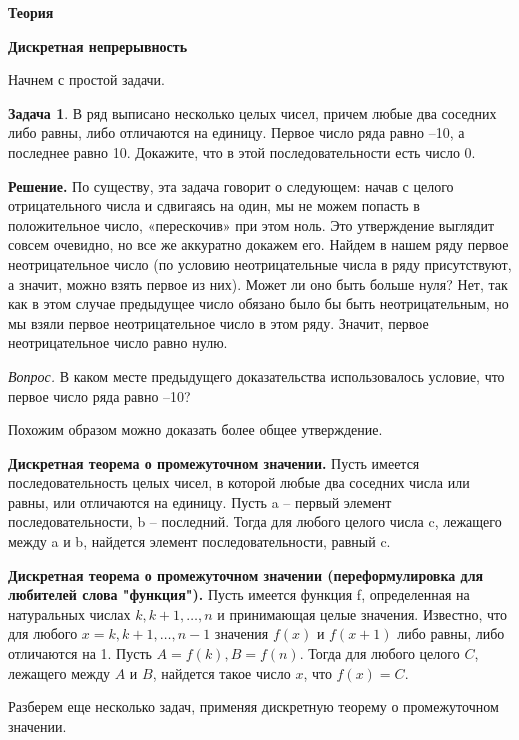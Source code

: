 \hspace{3mm}

\centerline{\bf \Huge Теория}
\centerline{\bf \Huge Дискретная непрерывность}

Начнем с простой задачи. 

\textbf{Задача 1}. В ряд выписано несколько целых чисел, причем любые два соседних либо равны, либо отличаются на единицу. Первое число ряда равно –10, а последнее равно 10. Докажите, что в этой последовательности есть число 0.

\textbf{Решение.} По существу, эта задача говорит о следующем: начав с целого отрицательного числа и сдвигаясь на один, мы не можем попасть в положительное число, «перескочив» при этом ноль. Это утверждение выглядит совсем очевидно, но все же аккуратно докажем его. Найдем в нашем ряду первое неотрицательное число (по условию неотрицательные числа в ряду присутствуют, а значит, можно взять первое из них). Может ли оно быть больше нуля? Нет, так как в этом случае предыдущее число обязано было бы быть неотрицательным, но мы взяли первое неотрицательное число в этом ряду. Значит, первое неотрицательное число равно нулю.

\textit{Вопрос.} В каком месте предыдущего доказательства использовалось условие, что первое число ряда равно –10?

Похожим образом можно доказать более общее утверждение.

\textbf{Дискретная теорема о промежуточном значении.} Пусть имеется последовательность целых чисел, в которой любые два соседних числа или равны, или отличаются на единицу. Пусть a – первый элемент последовательности, b – последний. Тогда для любого целого числа c, лежащего между a и b, найдется элемент последовательности, равный c.

\textbf{Дискретная теорема о промежуточном значении (переформулировка для любителей слова "функция").} Пусть имеется функция f, определенная на натуральных числах $k, k + 1, \dotsc, n$ и принимающая целые значения. Известно, что для любого $x = k , k + 1,\dotsc, n -1$ значения $f(x)$ и $f(x+1)$ либо равны, либо отличаются на 1. Пусть $A =f(k), B = f(n)$. Тогда для любого целого $C$, лежащего между $A$ и $B$, найдется такое число $x$, что $f(x) = C$.

Разберем еще несколько задач, применяя дискретную теорему о промежуточном значении.


\newpage

\hspace{3mm}

